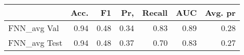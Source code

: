 \begin{tabular}{lrrrrrr}
\toprule
{} &  Acc. &    F1 &   Pr, &  Recall &   AUC &  Avg. pr \\
\midrule
FNN\_avg Val  &  0.94 &  0.48 &  0.34 &    0.83 &  0.89 &     0.28 \\
FNN\_avg Test &  0.94 &  0.48 &  0.37 &    0.70 &  0.83 &     0.27 \\
\bottomrule
\end{tabular}
